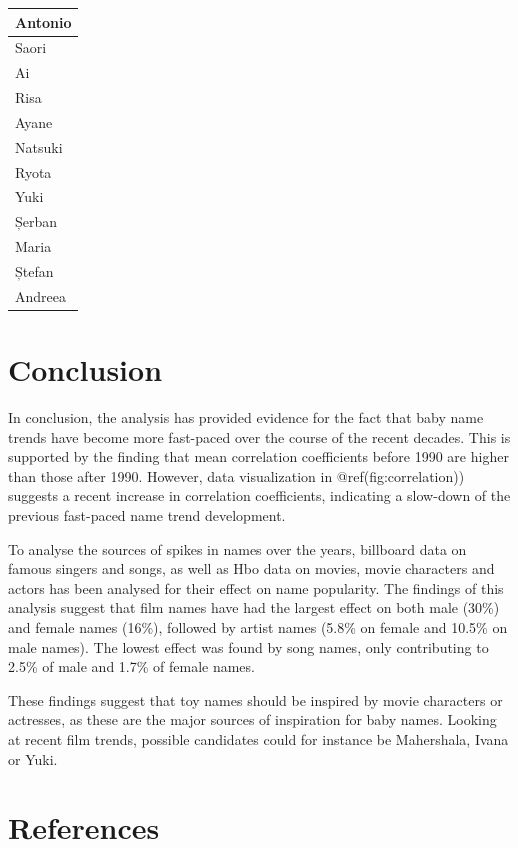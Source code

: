 \documentclass[11pt,preprint]{elsarticle}
\let\origtable\table
\let\endorigtable\endtable
\renewenvironment{table}[1][2] {
    \expandafter\origtable\expandafter[H]
} {
    \endorigtable
}
\numberwithin{equation}{section}
\numberwithin{figure}{section}
\numberwithin{table}{section}
\begin{document}
\begin{table}
\begin{tabular}[t]{l}
\hline
Antonio\\
\hline
Saori\\
\hline
Ai\\
\hline
Risa\\
\hline
Ayane\\
\hline
Natsuki\\
\hline
Ryota\\
\hline
Yuki\\
\hline
Șerban\\
\hline
Maria\\
\hline
Ștefan\\
\hline
Andreea\\
\hline
\end{tabular}
\end{table}

\section{Conclusion}\label{conclusion}

In conclusion, the analysis has provided evidence for the fact that baby
name trends have become more fast-paced over the course of the recent
decades. This is supported by the finding that mean correlation
coefficients before 1990 are higher than those after 1990. However, data
visualization in @ref(fig:correlation)) suggests a recent increase in
correlation coefficients, indicating a slow-down of the previous
fast-paced name trend development.

To analyse the sources of spikes in names over the years, billboard data
on famous singers and songs, as well as Hbo data on movies, movie
characters and actors has been analysed for their effect on name
popularity. The findings of this analysis suggest that film names have
had the largest effect on both male (30\%) and female names (16\%),
followed by artist names (5.8\% on female and 10.5\% on male names). The
lowest effect was found by song names, only contributing to 2.5\% of
male and 1.7\% of female names.

These findings suggest that toy names should be inspired by movie
characters or actresses, as these are the major sources of inspiration
for baby names. Looking at recent film trends, possible candidates could
for instance be Mahershala, Ivana or Yuki.

\newpage

\section*{References}\label{references}
\end{document}
